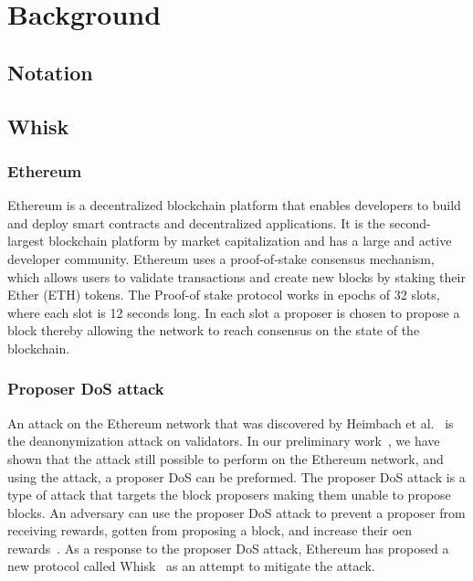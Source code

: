 
\section{Background}\label{sec:background}


\subsection{Notation}\label{sec:background-notation}


\subsection{Whisk}\label{sec:related-work-whisk}

\subsubsection{Ethereum}\label{sec:background-ethereum}
Ethereum is a decentralized blockchain platform that enables developers to build and deploy smart contracts and decentralized applications.
It is the second-largest blockchain platform by market capitalization and has a large and active developer community.
Ethereum uses a proof-of-stake consensus mechanism, which allows users to validate transactions and create new blocks by staking their Ether (ETH) tokens.
The Proof-of stake protocol works in epochs of 32 slots, where each slot is 12 seconds long.
In each slot a proposer is chosen to propose a block thereby allowing the network to reach consensus on the state of the blockchain.

\subsubsection{Proposer DoS attack}\label{sec:background-proposer-DoS-attacks}
An attack on the Ethereum network that was discovered by Heimbach et al.~\cite{heimbach2024deanonymizingethereumvalidatorsp2p} is the deanonymization attack on validators.
In our preliminary work~\cite{ouroldpaper}, we have shown that the attack still possible to perform on the Ethereum network, and using the attack, a proposer DoS can be preformed.
The proposer DoS attack is a type of attack that targets the block proposers making them unable to propose blocks.
An adversary can use the proposer DoS attack to prevent a proposer from receiving rewards, gotten from proposing a block, and increase their oen rewards~\cite{EthereumSSLE2024}.
As a response to the proposer DoS attack, Ethereum has proposed a new protocol called Whisk~\cite{Whisk2024} as an attempt to mitigate the attack.

